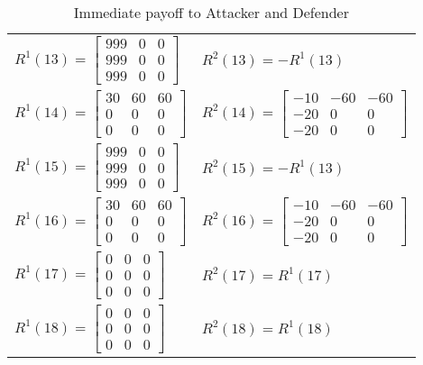 \documentclass{acm_proc_article-sp}
\begin{document}
\begin{table}[htbp]
\begin{tabular}{ll}
$R^{1}(13)=\begin{bmatrix}999&0&0 \\999&0&0 \\999&0&0\end{bmatrix}$          &$R^{2}(13)=-R^{1}(13)$\\
$R^{1}(14)=\begin{bmatrix}30&60&60 \\0&0&0 \\0&0&0\end{bmatrix}$          &$R^{2}(14)=\begin{bmatrix}-10&-60&-60 \\-20&0&0 \\-20&0&0\end{bmatrix}$\\
$R^{1}(15)=\begin{bmatrix}999&0&0 \\999&0&0 \\999&0&0\end{bmatrix}$          &$R^{2}(15)=-R^{1}(13)$\\
$R^{1}(16)=\begin{bmatrix}30&60&60 \\0&0&0 \\0&0&0\end{bmatrix}$          &$R^{2}(16)=\begin{bmatrix}-10&-60&-60 \\-20&0&0 \\-20&0&0\end{bmatrix}$\\
$R^{1}(17)=\begin{bmatrix}0&0&0 \\0&0&0 \\0&0&0\end{bmatrix}$                 &$R^{2}(17)=R^{1}(17)$   \\
$R^{1}(18)=\begin{bmatrix}0&0&0 \\0&0&0 \\0&0&0\end{bmatrix}$                 &$R^{2}(18)=R^{1}(18)$   \\
\hline
\end{tabular}
\caption{\label{rewardcost} Immediate payoff to Attacker and Defender}
\end{table}
\end{document}
